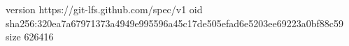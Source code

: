 version https://git-lfs.github.com/spec/v1
oid sha256:320ea7a67971373a4949e995596a45c17de505efad6e5203ee69223a0bf88c59
size 626416
